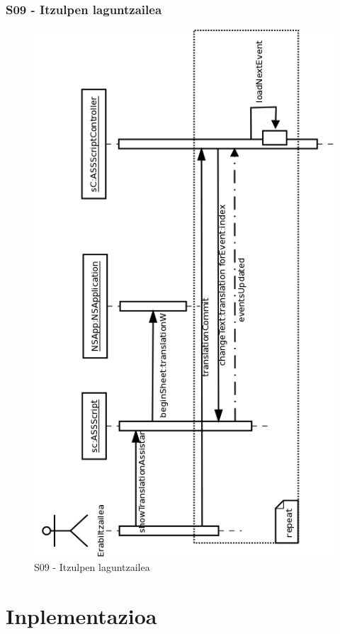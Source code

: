 \subsubsection{S09 - Itzulpen laguntzailea}
\begin{figure}[htp]
\begin{center}
\includegraphics[scale=0.4]{Pictures/Chapter4/Diseinua/S09.png}
\caption{S09 - Itzulpen laguntzailea}
\label{s09d}
\end{center}
\end{figure}


\newpage

\section{Inplementazioa}

